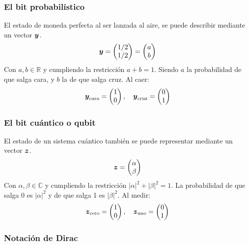 \begin{frame}
\frametitle{El bit probabilístico}
%
El estado de moneda perfecta al ser lanzada al aire, se puede describir mediante 
un vector $\boldsymbol{y}$.
$$ \boldsymbol{y} = \begin{pmatrix} 1/2 \\ 1/2 \end{pmatrix} = \begin{pmatrix} a \\ b \end{pmatrix} $$
Con $a,b \in \mathbb R$ y cumpliendo la restricción $a + b = 1$.
Siendo $a$ la probabilidad de que salga cara, y $b$ la de que salga cruz.  Al 
caer:
$$ \boldsymbol{y}_{\text{cara}} = \begin{pmatrix} 1 \\ 0 \end{pmatrix},\quad
\boldsymbol{y}_{\text{cruz}} = \begin{pmatrix} 0 \\ 1 \end{pmatrix}$$
\end{frame}
\begin{frame}
\frametitle{El bit cuántico o qubit}
El estado de un sistema cuántico también se puede representar mediante un vector 
$\boldsymbol{z}$.
$$ \boldsymbol{z} = \begin{pmatrix} \alpha \\ \beta \end{pmatrix} $$
Con $\alpha, \beta \in \mathbb C$ y cumpliendo la restricción $|\alpha|^2 + 
|\beta|^2 = 1$. La probabilidad de que salga 0 es $|\alpha|^2$ y de que salga 1 
es $|\beta|^2$. Al medir:
$$ \boldsymbol{z}_{\text{cero}} = \begin{pmatrix} 1 \\ 0 \end{pmatrix},\quad
\boldsymbol{z}_{\text{uno}} = \begin{pmatrix} 0 \\ 1 \end{pmatrix}$$


\end{frame}
\begin{frame}
\frametitle{Notación de Dirac}

\end{frame}


